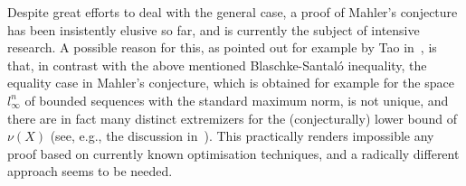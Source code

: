 \documentclass{icmart}
\theoremstyle{definition}
\begin{document}



\smallskip

Despite great efforts to deal with the general case, a proof of Mahler's conjecture has been insistently elusive so far, and is currently the subject of intensive research.
A possible reason for this, as pointed out for example by Tao in~\cite{Tao}, is that, in contrast with the above mentioned Blaschke-Santal\'o inequality, the equality case
in Mahler's conjecture, which is obtained for example for the space
$l^n_{\infty}$ of bounded sequences with the standard maximum norm,
is not unique, and there are in fact many distinct extremizers for the (conjecturally) lower bound of $\nu(X)$ (see, e.g., the discussion in~\cite{Tao}).
This practically renders impossible any proof based on currently known optimisation techniques, and a radically different approach seems to be needed. 
%
%
\end{document}
